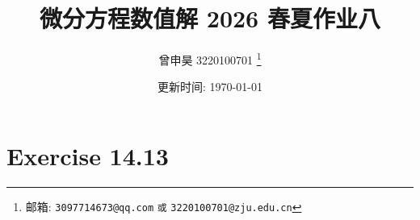 \documentclass[a4paper]{article}
\begin{document}
\title{微分方程数值解 2026 春夏作业八}

\author{曾申昊 3220100701
  \thanks{邮箱: \texttt{3097714673@qq.com}
                            \texttt{或} \texttt{3220100701@zju.edu.cn}}}

\date{更新时间: \today}

\maketitle

\section*{Exercise 14.13}
\end{document}
